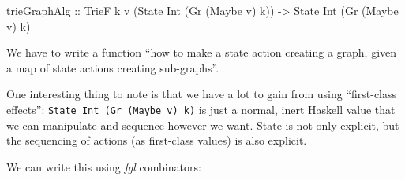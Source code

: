 \documentclass[]{article}
\newenvironment{Shaded}{}{}
\newcommand{\CommentTok}[1]{\textcolor[rgb]{0.38,0.63,0.69}{\textit{#1}}}
\newcommand{\DataTypeTok}[1]{\textcolor[rgb]{0.56,0.13,0.00}{#1}}
\newcommand{\FunctionTok}[1]{\textcolor[rgb]{0.02,0.16,0.49}{#1}}
\newcommand{\KeywordTok}[1]{\textcolor[rgb]{0.00,0.44,0.13}{\textbf{#1}}}
\newcommand{\NormalTok}[1]{#1}
\newcommand{\OperatorTok}[1]{\textcolor[rgb]{0.40,0.40,0.40}{#1}}
\newcommand{\OtherTok}[1]{\textcolor[rgb]{0.00,0.44,0.13}{#1}}
\begin{document}
\begin{Shaded}
\begin{Highlighting}[]
\NormalTok{trieGraphAlg}
\OtherTok{    ::} \DataTypeTok{TrieF}\NormalTok{ k v (}\DataTypeTok{State} \DataTypeTok{Int}\NormalTok{ (}\DataTypeTok{Gr}\NormalTok{ (}\DataTypeTok{Maybe}\NormalTok{ v) k))}
    \OtherTok{{-}\textgreater{}} \DataTypeTok{State} \DataTypeTok{Int}\NormalTok{ (}\DataTypeTok{Gr}\NormalTok{ (}\DataTypeTok{Maybe}\NormalTok{ v) k)}
\end{Highlighting}
\end{Shaded}

We have to write a function ``how to make a state action creating a graph, given
a map of state actions creating sub-graphs''.

One interesting thing to note is that we have a lot to gain from using
``first-class effects'': \texttt{State\ Int\ (Gr\ (Maybe\ v)\ k)} is just a
normal, inert Haskell value that we can manipulate and sequence however we want.
State is not only explicit, but the sequencing of actions (as first-class
values) is also explicit.

We can write this using \emph{fgl} combinators:

\begin{Shaded}
\end{Shaded}
\end{document}
